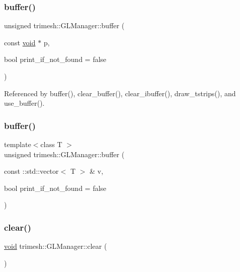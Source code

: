 \subsubsection{\texorpdfstring{buffer()}{buffer()}\hspace{0.1cm}{\footnotesize\ttfamily [1/2]}}
{\footnotesize\ttfamily unsigned trimesh\+::\+G\+L\+Manager\+::buffer (\begin{DoxyParamCaption}\item[{const \hyperlink{namespacetrimesh_a784ddfd979e1c579bda795a8edfc3f43}{void} $\ast$}]{p,  }\item[{bool}]{print\+\_\+if\+\_\+not\+\_\+found = {\ttfamily false} }\end{DoxyParamCaption})}



Referenced by buffer(), clear\+\_\+buffer(), clear\+\_\+ibuffer(), draw\+\_\+tstrips(), and use\+\_\+buffer().

\mbox{\label{classtrimesh_1_1GLManager_a4c49c8427129d49fe96046ccc4169d8c}} 
\subsubsection{\texorpdfstring{buffer()}{buffer()}\hspace{0.1cm}{\footnotesize\ttfamily [2/2]}}
{\footnotesize\ttfamily template$<$class T $>$ \\
unsigned trimesh\+::\+G\+L\+Manager\+::buffer (\begin{DoxyParamCaption}\item[{const \+::std\+::vector$<$ T $>$ \&}]{v,  }\item[{bool}]{print\+\_\+if\+\_\+not\+\_\+found = {\ttfamily false} }\end{DoxyParamCaption})\hspace{0.3cm}{\ttfamily [inline]}}

\mbox{\label{classtrimesh_1_1GLManager_ada5d1ddf3796de2c9c9b3b6ec5289335}} 
\subsubsection{\texorpdfstring{clear()}{clear()}}
{\footnotesize\ttfamily \hyperlink{namespacetrimesh_a784ddfd979e1c579bda795a8edfc3f43}{void} trimesh\+::\+G\+L\+Manager\+::clear (\begin{DoxyParamCaption}{ }\end{DoxyParamCaption})}



